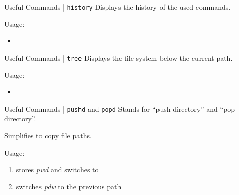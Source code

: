 \documentclass{setbeamer}
\begin{document}
\begin{frame}{Useful Commands | \texttt{history}}
    Displays the history of the used commands.

    \vspace{0.3cm}

    Usage:
    \begin{itemize}
        \item {}
    \end{itemize}
\end{frame}

\begin{frame}{Useful Commands | \texttt{tree}}
    Displays the file system below the current path.

    \vspace{0.3cm}

    Usage:
    \begin{itemize}
        \item {}
    \end{itemize}
\end{frame}

\begin{frame}{Useful Commands | \texttt{pushd} and \texttt{popd}}
    Stands for ``push directory'' and ``pop directory''.

    \vspace{0.3cm}

    Simplifies to copy file paths.

    \vspace{0.3cm}

    Usage:
    \begin{enumerate}
        \item {}\textemdash stores \emph{pwd} and switches to 
        \item {}\textemdash switches \emph{pdw} to the previous path
    \end{enumerate}
\end{frame}
\end{document}
